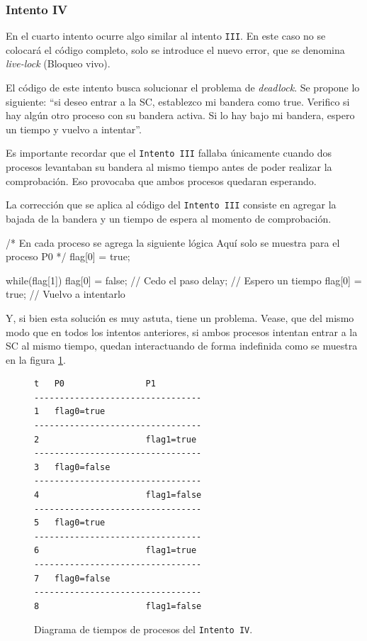 \subsubsection{Intento IV}

En el cuarto intento ocurre algo similar al intento \texttt{III}. En este caso no se colocará el código completo, solo se introduce el nuevo error, que se denomina \emph{live-lock} (Bloqueo vivo). 

El código de este intento busca solucionar el problema de \emph{deadlock}. Se propone lo siguiente: ``si deseo entrar a la SC, establezco mi bandera como true. Verifico si hay algún otro proceso con su bandera activa. Si lo hay bajo mi bandera, espero un tiempo y vuelvo a intentar''.

Es importante recordar que el \texttt{Intento III} fallaba únicamente cuando dos procesos levantaban su bandera al mismo tiempo antes de poder realizar la comprobación. Eso provocaba que ambos procesos quedaran esperando.

La corrección que se aplica al código del \texttt{Intento III} consiste en agregar la bajada de la bandera y un tiempo de espera al momento de comprobación.
\begin{ccode}[title=Intento IV]
/* En cada proceso se agrega la siguiente lógica 
   Aquí solo se muestra para el proceso P0 */
flag[0] = true;

while(flag[1]) {
  flag[0] = false;   // Cedo el paso
  delay;             // Espero un tiempo
  flag[0] = true;    // Vuelvo a intentarlo
}
\end{ccode}

Y, si bien esta solución es muy astuta, tiene un problema. Vease, que del mismo modo que en todos los intentos anteriores, si ambos procesos intentan entrar a la SC al mismo tiempo, quedan interactuando de forma indefinida como se muestra en la figura \ref{fig:intento4}.

\begin{figure}[!ht]
\centering
\begin{minipage}{0.5\textwidth}
\centering
\begingroup
\footnotesize
\begin{verbatim}
t   P0                P1
---------------------------------
1   flag0=true
---------------------------------
2                     flag1=true
---------------------------------
3   flag0=false
---------------------------------
4                     flag1=false
---------------------------------
5   flag0=true
---------------------------------
6                     flag1=true
---------------------------------
7   flag0=false
---------------------------------
8                     flag1=false
\end{verbatim}
\endgroup
\end{minipage}
\caption{Diagrama de tiempos de procesos del \texttt{Intento IV}.}
\label{fig:intento4}
\end{figure}

